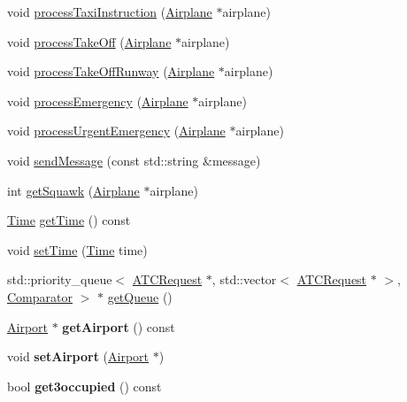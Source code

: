 \begin{DoxyCompactItemize}
\item 
void \hyperlink{classATC_a3bd6b8fdf0822b6fbead39f0d2e0b79e}{process\+Taxi\+Instruction} (\hyperlink{classAirplane}{Airplane} $\ast$airplane)
\item 
void \hyperlink{classATC_aa82096d5cbcaeea3d7c1dd0d62dabe6e}{process\+Take\+Off} (\hyperlink{classAirplane}{Airplane} $\ast$airplane)
\item 
void \hyperlink{classATC_aab426feafc260201737fbb48b456e814}{process\+Take\+Off\+Runway} (\hyperlink{classAirplane}{Airplane} $\ast$airplane)
\item 
void \hyperlink{classATC_a72ffc0a328a070d950c0d9002e81b3d5}{process\+Emergency} (\hyperlink{classAirplane}{Airplane} $\ast$airplane)
\item 
void \hyperlink{classATC_a2a9c0ee0a52377dc10afe3077bd92dde}{process\+Urgent\+Emergency} (\hyperlink{classAirplane}{Airplane} $\ast$airplane)
\item 
void \hyperlink{classATC_ab67531d65dfabc849ab2eff75c6c049b}{send\+Message} (const std\+::string \&message)
\item 
int \hyperlink{classATC_ac4c1f87e32b3d230843611dc12763c02}{get\+Squawk} (\hyperlink{classAirplane}{Airplane} $\ast$airplane)
\item 
\hyperlink{classTime}{Time} \hyperlink{classATC_a4083c8d08f70de6e6f9481cfb4f108ce}{get\+Time} () const 
\item 
void \hyperlink{classATC_ac23ab7bf78579f5fe7d236f204894443}{set\+Time} (\hyperlink{classTime}{Time} time)
\item 
std\+::priority\+\_\+queue$<$ \hyperlink{structATCRequest}{A\+T\+C\+Request} $\ast$, std\+::vector$<$ \hyperlink{structATCRequest}{A\+T\+C\+Request} $\ast$ $>$, \hyperlink{structComparator}{Comparator} $>$ $\ast$ \hyperlink{classATC_a77a729e46e14956d65550f2dcd6b8d96}{get\+Queue} ()
\item 
\hyperlink{classAirport}{Airport} $\ast$ {\bfseries get\+Airport} () const \hypertarget{classATC_a6fb413edf7b32e9caa989eaf14db7eb7}{}\label{classATC_a6fb413edf7b32e9caa989eaf14db7eb7}

\item 
void {\bfseries set\+Airport} (\hyperlink{classAirport}{Airport} $\ast$)\hypertarget{classATC_add8d36b90b6a765fd0c3a03fe3ea6df0}{}\label{classATC_add8d36b90b6a765fd0c3a03fe3ea6df0}

\item 
bool {\bfseries get3occupied} () const \hypertarget{classATC_a42d6e1db07222e692efc1787d55f6207}{}\label{classATC_a42d6e1db07222e692efc1787d55f6207}


\end{DoxyCompactItemize}
